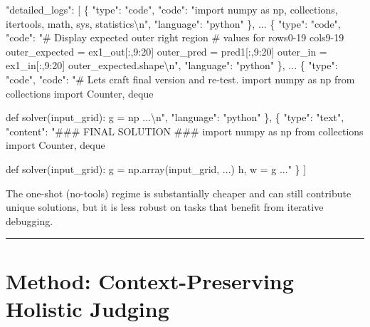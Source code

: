 \documentclass[11pt]{article}
\newenvironment{Shaded}{}{}
\newcommand{\NormalTok}[1]{#1}
\renewenvironment{Shaded}{\begin{snugshade}}{\end{snugshade}}
\begin{document}
\begin{Shaded}
\begin{Highlighting}[]
\NormalTok{"detailed\_logs": [}
\NormalTok{  \{}
\NormalTok{    "type": "code",}
\NormalTok{    "code": "import numpy as np, collections,}
\NormalTok{             itertools, math, sys, statistics\textbackslash{}n",}
\NormalTok{    "language": "python"}
\NormalTok{  \},}
\NormalTok{  ...}
\NormalTok{  \{}
\NormalTok{    "type": "code",}
\NormalTok{    "code": "\# Display expected outer right region}
\NormalTok{             \# values for rows0{-}19 cols9{-}19}
\NormalTok{             outer\_expected = ex1\_out[:,9:20]}
\NormalTok{             outer\_pred = pred1[:,9:20]}
\NormalTok{             outer\_in = ex1\_in[:,9:20]}
\NormalTok{             outer\_expected.shape\textbackslash{}n",}
\NormalTok{    "language": "python"}
\NormalTok{  \},}
\NormalTok{  ...}
\NormalTok{  \{}
\NormalTok{    "type": "code",}
\NormalTok{    "code": "\# Let\textquotesingle{}s craft final version and re{-}test.}
\NormalTok{             import numpy as np}
\NormalTok{             from collections import Counter, deque}

\NormalTok{             def solver(input\_grid):}
\NormalTok{                 g = np ...\textbackslash{}n",}
\NormalTok{    "language": "python"}
\NormalTok{  \},}
\NormalTok{  \{}
\NormalTok{    "type": "text",}
\NormalTok{    "content": "\#\#\# FINAL SOLUTION \#\#\#}
\NormalTok{               import numpy as np}
\NormalTok{               from collections import Counter, deque}

\NormalTok{               def solver(input\_grid):}
\NormalTok{                   g = np.array(input\_grid, ...)}
\NormalTok{                   h, w = g ..."}
\NormalTok{  \}}
\NormalTok{]}
\end{Highlighting}
\end{Shaded}

The one-shot (no-tools) regime is substantially cheaper and can still
contribute unique solutions, but it is less robust on tasks that benefit
from iterative debugging.

\begin{center}\rule{0.5\linewidth}{0.5pt}\end{center}

\hypertarget{method-context-preserving-holistic-judging}{%
\section{Method: Context-Preserving Holistic
Judging}\label{method-context-preserving-holistic-judging}}
\end{document}
